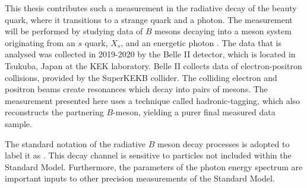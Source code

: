 This thesis contributes such a measurement in the radiative decay of the beauty quark, where it transitions to a strange quark and a photon.
The measurement will be performed by studying data of $B$ mesons decaying into a meson system originating from an $s$ quark, $X_s$, and an energetic photon \g.
The data that is analysed was collected in 2019-2020 by the Belle II detector, which is located in Tsukuba, Japan at the KEK laboratory.
Belle II collects data of electron-positron collisions, provided by the SuperKEKB collider.
The colliding electron and positron beams create \FourS resonances which decay into pairs of \B mesons.
The measurement presented here uses a technique called hadronic-tagging, 
which also reconstructs the partnering $B$-meson, yielding a purer final measured data sample.

The standard notation of the radiative $B$ meson decay processes is adopted to label it as \BtoXsgamma.
This decay channel is sensitive to particles not included within the Standard Model. 
Furthermore, the parameters of the photon energy spectrum are important inputs to other precision measurements of the Standard Model.


